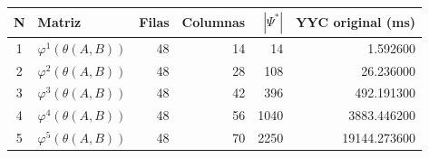 \begin{tabular}{c l r r r r}
\toprule
N & Matriz & Filas & Columnas & $|\Psi^*|$ & YYC original (ms) \\
\midrule
1 & $\varphi^{1}(\theta(A,B))$ & 48 & 14 & 14 & 1.592600 \\
2 & $\varphi^{2}(\theta(A,B))$ & 48 & 28 & 108 & 26.236000 \\
3 & $\varphi^{3}(\theta(A,B))$ & 48 & 42 & 396 & 492.191300 \\
4 & $\varphi^{4}(\theta(A,B))$ & 48 & 56 & 1040 & 3883.446200 \\
5 & $\varphi^{5}(\theta(A,B))$ & 48 & 70 & 2250 & 19144.273600 \\
\bottomrule
\end{tabular}

